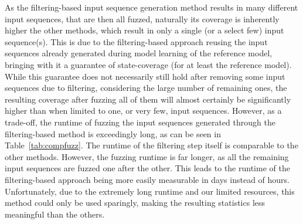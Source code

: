 As the filtering-based input sequence generation method results in many different input sequences, that are then all fuzzed, naturally its coverage is inherently higher the other methods, which result in only a single (or a select few) input sequence(s). This is due to the filtering-based approach reusing the input sequences already generated during model learning of the reference model, bringing with it a guarantee of state-coverage (for at least the reference model). While this guarantee does not necessarily still hold after removing some input sequences due to filtering, considering the large number of remaining ones, the resulting coverage after fuzzing all of them will almost certainly be significantly higher than when limited to one, or very few, input sequences. However, as a trade-off, the runtime of fuzzing the input sequences generated through the filtering-based method is exceedingly long, as can be seen in Table~\ref{tab:compfuzz}. The runtime of the filtering step itself is comparable to the other methods. However, the fuzzing runtime is far longer, as all the remaining input sequences are fuzzed one after the other. This leads to the runtime of the filtering-based approach being more easily measurable in days instead of hours. Unfortunately, due to the extremely long runtime and our limited resources, this method could only be used sparingly, making the resulting statistics less meaningful than the others. 

